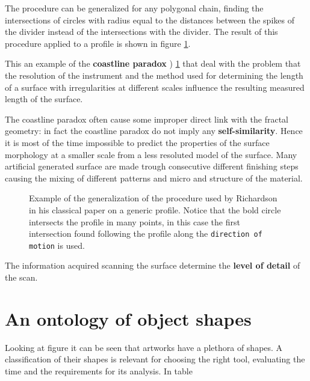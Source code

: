 The procedure can be generalized for any polygonal chain, finding the intersections of circles with radius equal to the distances between the spikes of the divider instead of the intersections with the divider. The result of this procedure applied to a profile is shown in figure \ref{fig:0_circles}. 

This an example of the  \textbf{coastline paradox} ) \ref{} that deal with the problem that the resolution of the instrument and the method used for determining the length of a surface with irregularities at different scales influence the resulting measured length of the surface. 




The coastline paradox often cause some improper direct link with the fractal geometry: in fact the coastline paradox do not imply any \textbf{self-similarity}. Hence it is most of the time impossible to predict the properties of the surface morphology at a smaller scale from a less resoluted model of the surface.  Many artificial generated surface are made trough consecutive different finishing steps causing the mixing of different patterns and micro and structure of the material.


\begin{figure}
    \centering
    
    \caption{Example of the generalization of the procedure used by Richardson in his classical paper on a generic profile. Notice that the bold circle intersects the profile in many points, in this case the first intersection found following the profile along the \texttt{direction of motion} is used. }
    \label{fig:0_circles}
\end{figure}
The information acquired scanning the surface determine the \textbf{level of detail}  of the scan.

\section{An ontology of object shapes}
Looking at figure it can be seen that artworks have a plethora of shapes. A classification of their shapes is relevant for choosing the right tool, evaluating the time and the requirements for its analysis. In table 

 

